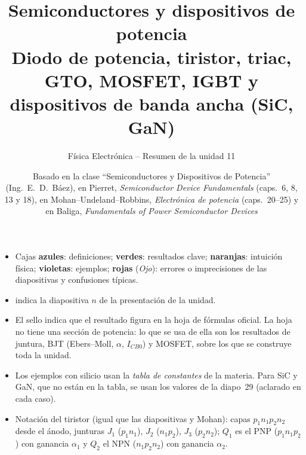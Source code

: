 \documentclass[11pt,a4paper]{article}
\title{\color{azul}\textbf{Semiconductores y dispositivos de potencia}\\[0.3em]
  \large Diodo de potencia, tiristor, triac, GTO, MOSFET, IGBT y dispositivos de banda ancha (SiC, GaN)}
\author{Física Electrónica -- Resumen de la unidad 11}
\date{Basado en la clase ``Semiconductores y Dispositivos de Potencia'' (Ing.\ E.\ D.\ Báez), en
Pierret, \emph{Semiconductor Device Fundamentals} (caps.~6, 8, 13 y 18), en Mohan--Undeland--Robbins,
\emph{Electrónica de potencia} (caps.~20--25) y en Baliga, \emph{Fundamentals of Power Semiconductor Devices}}
\begin{document}
\maketitle
\thispagestyle{empty}

\begin{tcolorbox}[base,colback=white,colframe=gris,title={Cómo leer este apunte}]
\small
\begin{itemize}
  \item Cajas \textcolor{azul}{\textbf{azules}}: definiciones; \textcolor{verde}{\textbf{verdes}}: resultados
  clave; \textcolor{naranja}{\textbf{naranjas}}: intuición física; \textcolor{violeta}{\textbf{violetas}}: ejemplos;
  \textcolor{rojo}{\textbf{rojas}} (\emph{Ojo}): errores o imprecisiones de las diapositivas y confusiones típicas.
  \item {} indica la diapositiva $n$ de la presentación de la unidad.
  \item El sello \enhojatexto{} indica que el resultado figura en la hoja de fórmulas oficial. La hoja
  no tiene una sección de potencia: lo que se usa de ella son los resultados de juntura, BJT
  (Ebers--Moll, $\alpha$, $I_{CB0}$) y MOSFET, sobre los que se construye toda la unidad.
  \item Los ejemplos con silicio usan la \emph{tabla de constantes} de la materia. Para SiC y GaN, que
  no están en la tabla, se usan los valores de la diapo~29 (aclarado en cada caso).
  \item Notación del tiristor (igual que las diapositivas y Mohan): capas $p_1n_1p_2n_2$ desde el ánodo,
  junturas $J_1$ ($p_1n_1$), $J_2$ ($n_1p_2$), $J_3$ ($p_2n_2$); $Q_1$ es el PNP ($p_1n_1p_2$) con
  ganancia $\alpha_1$ y $Q_2$ el NPN ($n_1p_2n_2$) con ganancia $\alpha_2$.
\end{itemize}
\end{tcolorbox}

\tableofcontents
\newpage













\end{document}
